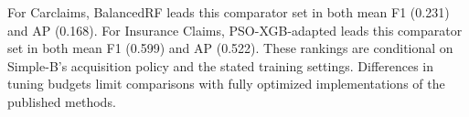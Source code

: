 For Carclaims, BalancedRF leads this comparator set in both mean F1 (0.231) and AP (0.168). For Insurance Claims, PSO-XGB-adapted leads this comparator set in both mean F1 (0.599) and AP (0.522). These rankings are conditional on Simple-B's acquisition policy and the stated training settings. Differences in tuning budgets limit comparisons with fully optimized implementations of the published methods.
